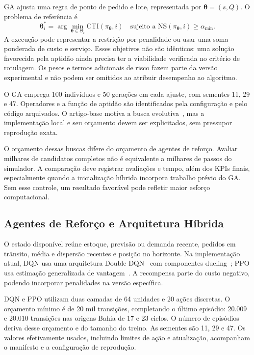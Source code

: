 GA ajusta uma regra de ponto de pedido e lote, representada por $\boldsymbol\theta=(s,Q)$. O problema de referência é
\begin{equation}
\boldsymbol\theta_i^*=\arg\min_{\boldsymbol\theta\in\Theta_i}\mathrm{CTI}(\pi_{\boldsymbol\theta},i)
\quad\text{sujeito a }\mathrm{NS}(\pi_{\boldsymbol\theta},i)\geq\alpha_{\min}.
\label{eq:obj_metaheuristicas}
\end{equation}
A execução pode representar a restrição por penalidade ou usar uma soma ponderada de custo e serviço. Esses objetivos não são idênticos: uma solução favorecida pela aptidão ainda precisa ter a viabilidade verificada no critério de rotulagem. Os pesos e termos adicionais de risco fazem parte da versão experimental e não podem ser omitidos ao atribuir desempenho ao algoritmo.

O GA emprega 100 indivíduos e 50 gerações em cada ajuste, com sementes 11, 29 e 47. Operadores e a função de aptidão são identificados pela configuração e pelo código arquivados. O artigo-base motiva a busca evolutiva~\citep{Zabraoui2025GaDQN}, mas a implementação local e seu orçamento devem ser explicitados, sem pressupor reprodução exata.

O orçamento dessas buscas difere do orçamento de agentes de reforço. Avaliar milhares de candidatos completos não é equivalente a milhares de passos do simulador. A comparação deve registrar avaliações e tempo, além dos KPIs finais, especialmente quando a inicialização híbrida incorpora trabalho prévio do GA. Sem esse controle, um resultado favorável pode refletir maior esforço computacional.

\subsection{Agentes de Reforço e Arquitetura Híbrida}

O estado disponível reúne estoque, previsão ou demanda recente, pedidos em trânsito, média e dispersão recentes e posição no horizonte. Na implementação atual, DQN usa uma arquitetura Double DQN~\citep{VanHasselt2016DoubleDQN} com componentes dueling~\citep{Wang2016DuelingDQN}; PPO usa estimação generalizada de vantagem~\citep{Schulman2016GAE}. A recompensa parte do custo negativo, podendo incorporar penalidades na versão específica.

DQN e PPO utilizam duas camadas de 64 unidades e 20 ações discretas. O orçamento mínimo é de 20 mil transições, completando o último episódio: 20.009 e 20.010 transições nas origens Bahia de 17 e 23 ciclos. O número de episódios deriva desse orçamento e do tamanho do treino. As sementes são 11, 29 e 47. Os valores efetivamente usados, incluindo limites de ação e atualização, acompanham o manifesto e a configuração de reprodução.

